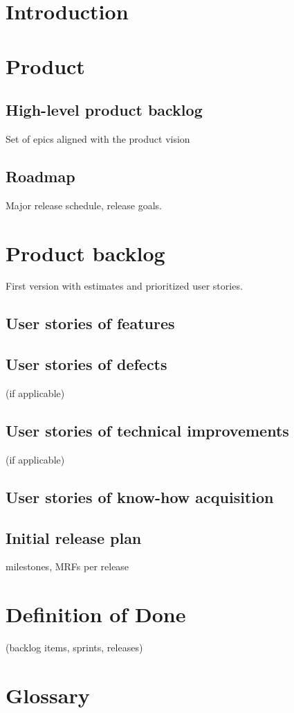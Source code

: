 \documentclass[a4paper]{article}
\begin{document}
	
	
	\tableofcontents
	\clearpage
	
	\section{Introduction}
	
	\section{Product}
		\subsection{High-level product backlog}
			Set of epics aligned with the product vision
		\subsection{Roadmap}
			Major release schedule, release goals.
	
	\section{Product backlog}
		First version with estimates and prioritized user stories.
		\subsection{User stories of features}
		\subsection{User stories of defects}
			(if applicable)
		\subsection{User stories of technical improvements}
			(if applicable)
		\subsection{User stories of know-how acquisition}
		\subsection{Initial release plan}
			milestones, MRFs per release
	
	\section{Definition of Done}
		(backlog items, sprints, releases)
		
	\section{Glossary}
\end{document}
